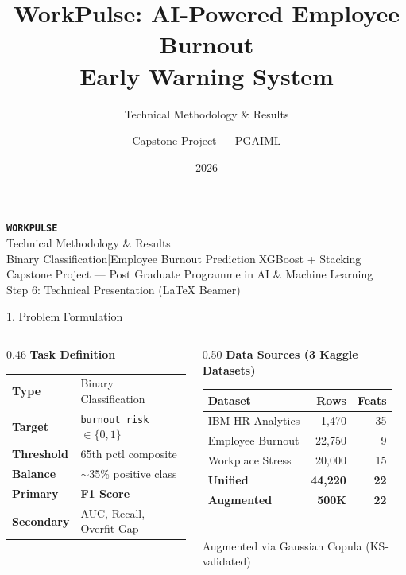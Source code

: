 \documentclass[aspectratio=169, 10pt]{beamer}
\title{WorkPulse: AI-Powered Employee Burnout\\Early Warning System}
\subtitle{Technical Methodology \& Results}
\author{Capstone Project --- PGAIML}
\date{2026}
\begin{document}
{
\begin{frame}[plain]
  \vspace{1.5cm}
  {\color{teal}\LARGE\texttt{\textbf{WORKPULSE}}}\\[6pt]
  {\large Technical Methodology \& Results}\\[12pt]
  {\color{slate400}\small Binary Classification\quad|\quad Employee Burnout Prediction\quad|\quad XGBoost + Stacking}\\[1.5cm]
  {\color{slate400}\footnotesize Capstone Project --- Post Graduate Programme in AI \& Machine Learning}\\[4pt]
  {\color{slate400}\footnotesize Step 6: Technical Presentation (LaTeX Beamer)}
\end{frame}
}

\begin{frame}{1. Problem Formulation}
\small
\begin{columns}[T]
\begin{column}{0.46\textwidth}
  \textbf{\color{teal}Task Definition}\\[4pt]
  \footnotesize
  \begin{tabular}{@{}l l@{}}
    \textbf{Type}      & Binary Classification \\
    \textbf{Target}    & \texttt{burnout\_risk} $\in \{0,1\}$ \\
    \textbf{Threshold} & 65th pctl composite \\
    \textbf{Balance}   & $\sim$35\% positive class \\
    \textbf{Primary}   & \textbf{F1 Score} \\
    \textbf{Secondary} & AUC, Recall, Overfit Gap \\
  \end{tabular}
\end{column}
\begin{column}{0.50\textwidth}
  \textbf{\color{amber}Data Sources (3 Kaggle Datasets)}\\[4pt]
  \footnotesize
  \begin{tabular}{@{}l r r@{}}
    \toprule
    \textbf{Dataset} & \textbf{Rows} & \textbf{Feats} \\
    \midrule
    IBM HR Analytics     & 1,470  & 35 \\
    Employee Burnout     & 22,750 & 9  \\
    Workplace Stress     & 20,000 & 15 \\
    \midrule
    \textbf{Unified}     & \textbf{44,220} & \textbf{22} \\
    \textbf{Augmented}   & \textbf{500K}   & \textbf{22} \\
    \bottomrule
  \end{tabular}\\[4pt]
  Augmented via Gaussian Copula (KS-validated)
\end{column}
\end{columns}
\end{frame}
\end{document}
